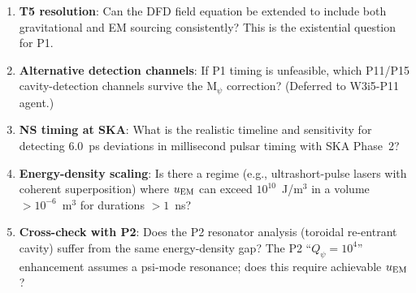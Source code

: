 \begin{enumerate}[label=\textbf{OQ-\arabic*.}, itemsep=4pt]
\item \textbf{T5 resolution}: Can the DFD field equation be extended to
  include both gravitational and EM sourcing consistently? This is the
  existential question for P1.
\item \textbf{Alternative detection channels}: If P1 timing is unfeasible,
  which P11/P15 cavity-detection channels survive the M$_\psi$ correction?
  (Deferred to W3i5-P11 agent.)
\item \textbf{NS timing at SKA}: What is the realistic timeline and
  sensitivity for detecting 6.0~ps deviations in millisecond pulsar
  timing with SKA Phase~2?
\item \textbf{Energy-density scaling}: Is there a regime (e.g.,
  ultrashort-pulse lasers with coherent superposition) where $u_{\rm EM}$
  can exceed $10^{10}$~J/m$^3$ in a volume $>10^{-6}$~m$^3$ for durations
  $> 1$~ns?
\item \textbf{Cross-check with P2}: Does the P2 resonator analysis
  (toroidal re-entrant cavity) suffer from the same energy-density gap?
  The P2 ``$Q_\psi = 10^4$'' enhancement assumes a psi-mode resonance;
  does this require achievable $u_{\rm EM}$?
\end{enumerate}

